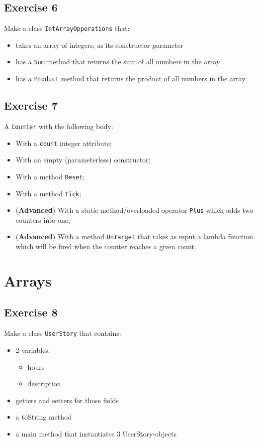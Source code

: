 \subsection{Exercise 6} 
Make a class \texttt{IntArrayOpperations} that:
            \begin{itemize}
                \item takes an array of integers, as its constructor parameter
                \item has a \texttt{Sum} method that returns the sum of all numbers in the array
                \item has a \texttt{Product} method that returns the product of all numbers in the array
            \end{itemize}

\subsection{Exercise 7} 
A \texttt{Counter} with the following body:
            \begin{itemize}
                \item With a \texttt{count} integer attribute;
                \item With an empty (parameterless) constructor;
                \item With a method \texttt{Reset};
                \item With a method \texttt{Tick};
                \item (\textbf{Advanced}) With a static method/overloaded operator \texttt{Plus} which adds two counters into one;
                \item (\textbf{Advanced}) With a method \texttt{OnTarget} that takes as input a lambda function which will be fired when the counter reaches a given count.
            \end{itemize}
            
    \section{Arrays}
\subsection{Exercise 8}
Make a class \texttt{UserStory} that contains:
                \begin{itemize}
                    \item 2 variables:
                        \begin{itemize}
                            \item hours
                            \item description
                        \end{itemize}

                        \item getters and setters for those fields
                        \item a toString method
                        \item a main method that instantiates 3 UserStory-objects
                \end{itemize}

